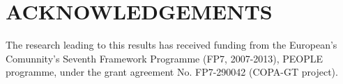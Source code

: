 \section*{ACKNOWLEDGEMENTS}

The research leading to this results has received funding from the European's Comunnity's Seventh Framework Programme (FP7, 2007-2013), PEOPLE programme, under the grant agreement No. FP7-290042 (COPA-GT project).